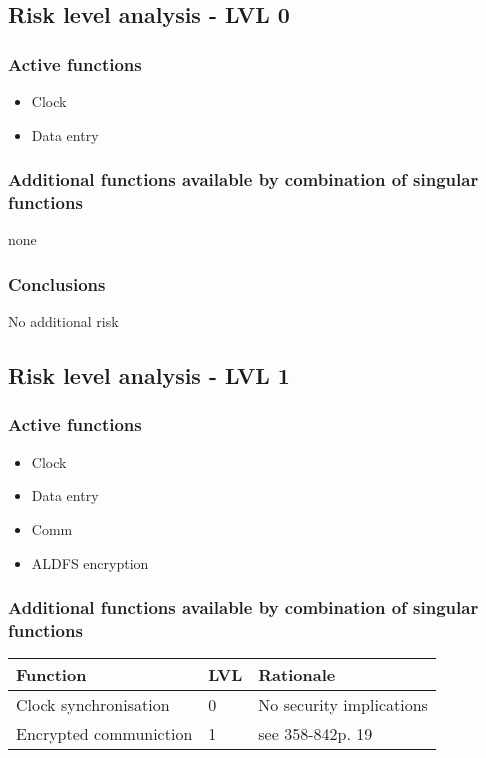 \documentclass[a4paper]{article}
\newcommand{\secnorm}{358-842}
\begin{document}
\subsection{Risk level analysis - LVL 0}

\subsubsection{Active functions}
\begin{itemize}
	\item	Clock
	\item	Data entry
\end{itemize}

\subsubsection{Additional functions available by combination of singular functions}
none

\subsubsection{Conclusions}
No additional risk

\subsection{Risk level analysis - LVL 1}

\subsubsection{Active functions}
\begin{itemize}
	\item	Clock
	\item	Data entry
	\item	Comm
	\item	ALDFS encryption
\end{itemize}

\subsubsection{Additional functions available by combination of singular functions}
\begin{longtable}{p{4cm}p{1cm}p{8cm}}
Function & LVL &  Rationale \\\hline\endfirsthead
Clock synchronisation & 0 & No security implications \\
Encrypted communiction & 1 & see \secnorm p. 19 \\
\end{longtable}
\end{document}
